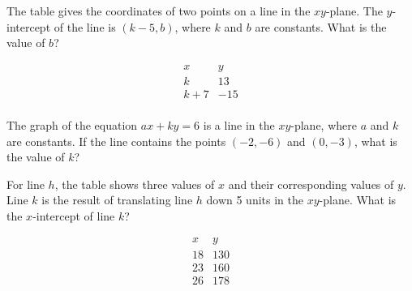 \vspace{0.5em}

\setcounter{questionnum}{0}

\noindent\markforreview

\vspace{1em}

The table gives the coordinates of two points on a line in the $xy$-plane. The $y$-intercept of the line is $(k - 5, b)$, where $k$ and $b$ are constants. What is the value of $b$?

\[
\begin{array}{c|c}
x & y \\
\hline
k & 13 \\
k + 7 & -15 \\
\end{array}
\]

\vspace{0.75em}


\vspace{2em}

\noindent\markforreview

\vspace{1em}

The graph of the equation $ax + ky = 6$ is a line in the $xy$-plane, where $a$ and $k$ are constants. If the line contains the points $(-2, -6)$ and $(0, -3)$, what is the value of $k$?

\vspace{0.75em}


\newpage
\noindent\markforreview

\vspace{1em}

For line $h$, the table shows three values of $x$ and their corresponding values of $y$. Line $k$ is the result of translating line $h$ down 5 units in the $xy$-plane. What is the $x$-intercept of line $k$?

\[
\begin{array}{c|c}
x & y \\
\hline
18 & 130 \\
23 & 160 \\
26 & 178 \\
\end{array}
\]

\vspace{0.75em}


